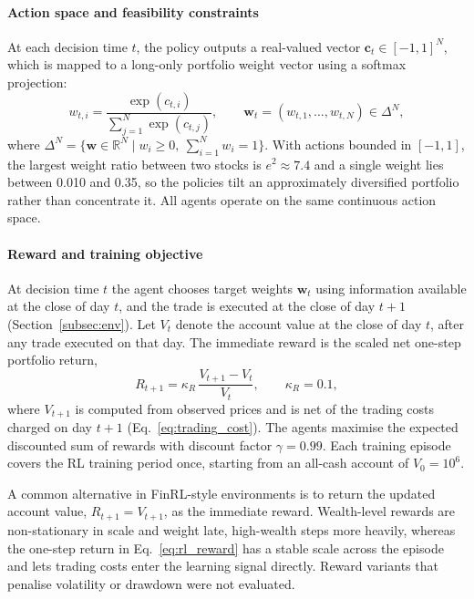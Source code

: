 \paragraph{Action space and feasibility constraints}
At each decision time $t$, the policy outputs a real-valued vector $\mathbf{c}_{t}\in[-1,1]^{N}$, which is mapped to a long-only portfolio weight vector using a softmax projection:
\begin{equation}
w_{t,i}=\frac{\exp(c_{t,i})}{\sum_{j=1}^{N}\exp(c_{t,j})},\qquad
\mathbf{w}_{t}=(w_{t,1},\ldots,w_{t,N})\in\Delta^{N},
\label{eq:portfolio_softmax}
\end{equation}
where $\Delta^{N}=\{\mathbf{w}\in\mathbb{R}^{N}\mid w_i\ge 0,\ \sum_{i=1}^{N}w_i=1\}$. {\color{blue}With actions bounded in $[-1,1]$, the largest weight ratio between two stocks is $e^{2}\approx7.4$ and a single weight lies between 0.010 and 0.35, so the policies tilt an approximately diversified portfolio rather than concentrate it.} All agents operate on the same continuous action space.

\paragraph{Reward and training objective}
{\color{blue}
At decision time $t$ the agent chooses target weights $\mathbf{w}_t$ using information available at the close of day $t$, and the trade is executed at the close of day $t+1$ (Section~\ref{subsec:env}). Let $V_t$ denote the account value at the close of day $t$, after any trade executed on that day. The immediate reward is the scaled net one-step portfolio return,
\begin{equation}
R_{t+1}=\kappa_R\,\frac{V_{t+1}-V_t}{V_t},\qquad \kappa_R=0.1,
\label{eq:rl_reward}
\end{equation}
where $V_{t+1}$ is computed from observed prices and is net of the trading costs charged on day $t+1$ (Eq.~\eqref{eq:trading_cost}). The agents maximise the expected discounted sum of rewards with discount factor $\gamma=0.99$. Each training episode covers the RL training period once, starting from an all-cash account of $V_0=10^6$.

A common alternative in FinRL-style environments is to return the updated account value, $R_{t+1}=V_{t+1}$, as the immediate reward. Wealth-level rewards are non-stationary in scale and weight late, high-wealth steps more heavily, whereas the one-step return in Eq.~\eqref{eq:rl_reward} has a stable scale across the episode and lets trading costs enter the learning signal directly. Reward variants that penalise volatility or drawdown were not evaluated.
\par}
